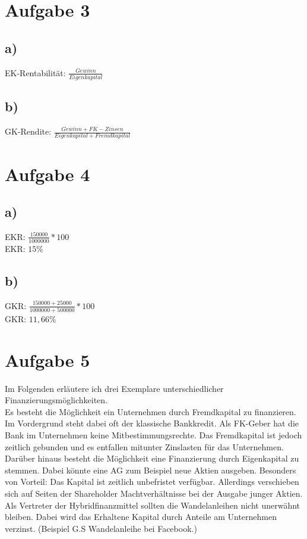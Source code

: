 \documentclass{article}
\begin{document}
	\section*{Aufgabe 3}
	\subsection*{a)}
	EK-Rentabilität: $\frac{Gewinn}{Eigenkapital}$
	\subsection*{b)}
	GK-Rendite: $\frac{Gewinn+FK-Zinsen}{Eigenkapital + Fremdkapital}$
	\section*{Aufgabe 4}
	\subsection*{a)}
	EKR: $\frac{150000}{1000000}*100$ \\
	EKR: $15 \%$
	\subsection*{b)}
	GKR: $\frac{150000 + 25000}{1000000 + 500000} * 100$ \\
	GKR: $11,66 \%$
	\section*{Aufgabe 5}
	Im Folgenden erläutere ich drei Exemplare unterschiedlicher Finanzierungsmöglichkeiten. \\
	Es besteht die Möglichkeit ein Unternehmen durch Fremdkapital zu finanzieren. Im Vordergrund steht dabei oft der klassische Bankkredit. Als FK-Geber hat die Bank im Unternehmen keine Mitbestimmungsrechte. Das Fremdkapital ist jedoch zeitlich gebunden und es entfallen mitunter Zinslasten für das Unternehmen. \\
	Darüber hinaus besteht die Möglichkeit eine Finanzierung durch Eigenkapital zu stemmen. Dabei könnte eine AG zum Beispiel neue Aktien ausgeben. Besonders von Vorteil: Das Kapital ist zeitlich unbefristet verfügbar. Allerdings verschieben sich auf Seiten der Shareholder Machtverhältnisse bei der Ausgabe junger Aktien. \\
	Als Vertreter der Hybridfinanzmittel sollten die Wandelanleihen nicht unerwähnt bleiben. Dabei wird das Erhaltene Kapital durch Anteile am Unternehmen verzinst. (Beispiel G.S Wandelanleihe bei Facebook.)
\end{document}

